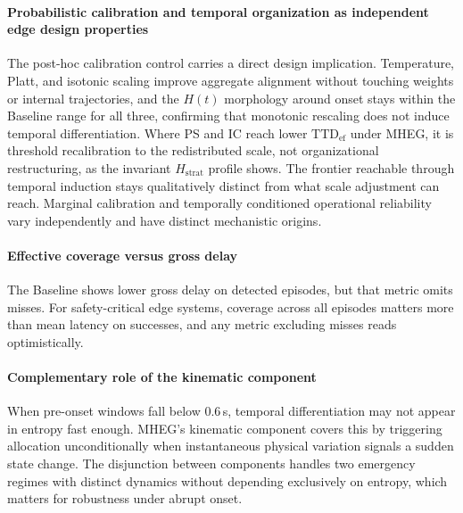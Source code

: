 \documentclass[a4paper,fleqn]{cas-dc}
\newcommand{\MHEG}{\mbox{MHEG}\xspace}
\begin{document}
\paragraph{Probabilistic calibration and temporal organization as
independent edge design properties}
The post-hoc calibration control carries a direct design implication.
Temperature, Platt, and isotonic scaling improve aggregate alignment without
touching weights or internal trajectories, and the $H(t)$ morphology around
onset stays within the Baseline range for all three, confirming that monotonic
rescaling does not induce temporal differentiation. Where PS and IC reach lower
$\mathrm{TTD}_{\mathrm{ef}}$ under \MHEG, it is threshold recalibration to the
redistributed scale, not organizational restructuring, as the invariant
$H_{\mathrm{strat}}$ profile shows. The frontier reachable through temporal
induction stays qualitatively distinct from what scale adjustment can reach.
Marginal calibration and temporally conditioned operational reliability vary
independently and have distinct mechanistic origins.
\paragraph{Effective coverage versus gross delay}
The Baseline shows lower gross delay on detected episodes, but that metric omits
misses. For safety-critical edge systems, coverage across all episodes matters
more than mean latency on successes, and any metric excluding misses reads
optimistically.
\paragraph{Complementary role of the kinematic component}
When pre-onset windows fall below 0.6\,s, temporal differentiation may not
appear in entropy fast enough. \MHEG's kinematic component covers this by
triggering allocation unconditionally when instantaneous physical variation
signals a sudden state change. The disjunction between components handles two
emergency regimes with distinct dynamics without depending exclusively on
entropy, which matters for robustness under abrupt onset.
\end{document}
